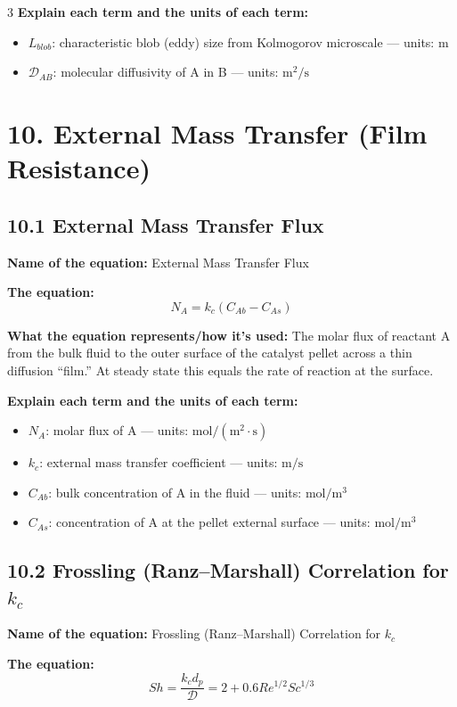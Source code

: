 \documentclass[8pt]{extarticle}
\begin{document}
\begin{multicols*}{3}
\textbf{Explain each term and the units of each term:}
\begin{itemize}
\item \(L_{blob}\): characteristic blob (eddy) size from Kolmogorov microscale --- units: \(\mathrm{m}\)
\item \(\mathcal{D}_{AB}\): molecular diffusivity of A in B --- units: \(\mathrm{m^2/s}\)
\end{itemize}

\section*{10. External Mass Transfer (Film Resistance)}

\subsection*{10.1 External Mass Transfer Flux}

\textbf{Name of the equation:} External Mass Transfer Flux

\textbf{The equation:}
\[
N_A=k_c(C_{Ab}-C_{As})
\]

\textbf{What the equation represents/how it's used:} The molar flux of reactant A from the bulk fluid to the outer surface of the catalyst pellet across a thin diffusion ``film.'' At steady state this equals the rate of reaction at the surface.

\textbf{Explain each term and the units of each term:}
\begin{itemize}
\item \(N_A\): molar flux of A --- units: \(\mathrm{mol/(m^2\cdot s)}\)
\item \(k_c\): external mass transfer coefficient --- units: \(\mathrm{m/s}\)
\item \(C_{Ab}\): bulk concentration of A in the fluid --- units: \(\mathrm{mol/m^3}\)
\item \(C_{As}\): concentration of A at the pellet external surface --- units: \(\mathrm{mol/m^3}\)
\end{itemize}

\subsection*{10.2 Frossling (Ranz--Marshall) Correlation for \(k_c\)}

\textbf{Name of the equation:} Frossling (Ranz--Marshall) Correlation for \(k_c\)

\textbf{The equation:}
\[
Sh=\frac{k_cd_p}{\mathcal{D}}=2+0.6Re^{1/2}Sc^{1/3}
\]


\end{multicols*}
\end{document}
